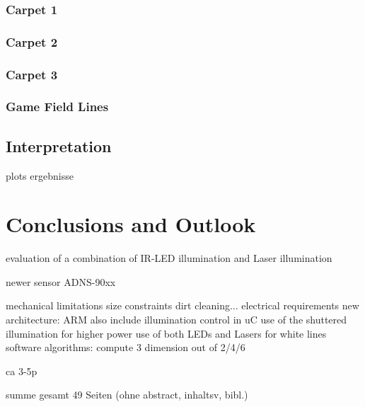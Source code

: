\documentclass[12pt,a4paper]{article}
\begin{document}
\subsubsection{Carpet 1}

\subsubsection{Carpet 2}

\subsubsection{Carpet 3}

\subsubsection{Game Field Lines}

\subsection{Interpretation}

  plots
  ergebnisse

\clearpage
\section{Conclusions and Outlook}

  evaluation of a combination of IR-LED illumination and Laser illumination

  newer sensor ADNS-90xx

  mechanical limitations
    size constraints
    dirt cleaning...
  electrical requirements
    new architecture: ARM
    also include illumination control in uC
      use of the shuttered illumination for higher power 
      use of both LEDs and Lasers for white lines
  software algorithms: compute 3 dimension out of 2/4/6

ca 3-5p


summe gesamt 49 Seiten (ohne abstract, inhaltsv, bibl.)


\clearpage
{}
\label{Bibliography}


%
\end{document}
